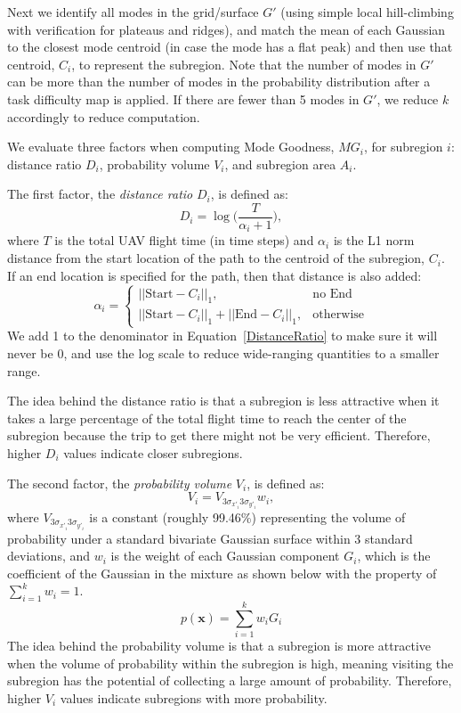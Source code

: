 \documentclass[journal]{IEEEtran}
\begin{document}
Next we identify all modes in the grid/surface $G'$ (using simple local hill-climbing with verification for plateaus and ridges), and match the mean of each Gaussian to the closest mode centroid (in case the mode has a flat peak) and then use that centroid, $C_i$, to represent the subregion. Note that the number of modes in $G'$ can be more than the number of modes in the probability distribution after a task difficulty map is applied. If there are fewer than 5 modes in $G'$, we reduce $k$ accordingly to reduce computation.

We evaluate three factors when computing Mode Goodness, $MG_i$, for subregion $i$: distance ratio $D_i$, probability volume $V_i$, and subregion area $A_i$. 

The first factor, the \textit{distance ratio} $D_i$, is defined as:
\begin{equation}
D_i = \log\Big(\frac{T}{\alpha_i+1}\Big),
\label{DistanceRatio}
\end{equation}
where $T$ is the total UAV flight time (in time steps) and $\alpha_i$ is the L1 norm distance from the start location of the path to the centroid of the subregion, $C_i$. If an end location is specified for the path, then that distance is also added:
\begin{equation}
\alpha_i = 
	\left\{
	\begin{array}{ll}
		||\mbox{Start}-C_i||_1, & \mbox{no End} \\
		||\mbox{Start}-C_i||_1 + ||\mbox{End}-C_i||_1, & \mbox{otherwise}
	\end{array}
	\right.
\label{Alpha}
\end{equation}
We add 1 to the denominator in Equation~\ref{DistanceRatio} to make sure it will never be 0, and use the log scale to reduce wide-ranging quantities to a smaller range. 

The idea behind the distance ratio is that a subregion is less attractive when it takes a large percentage of the total flight time to reach the center of the subregion because the trip to get there might not be very efficient. Therefore, higher $D_i$ values indicate closer subregions.

The second factor, the \textit{probability volume} $V_i$, is defined as:
\begin{equation}
V_i = V_{3\sigma_{x'_i}3\sigma_{y'_i}}w_i,
\label{Volume}
\end{equation}
where $V_{3\sigma_{x'_i}3\sigma_{y'_i}}$ is a constant (roughly 99.46\%) representing the volume of probability under a standard bivariate Gaussian surface within 3 standard deviations, and $w_i$ is the weight of each Gaussian component $G_i$, which is the coefficient of the Gaussian in the mixture as shown below with the property of $\sum_{i=1}^k w_i = 1$.
\begin{equation}
p(\mathbf{x}) = \sum_{i=1}^k w_i G_i
\label{Alphas}
\end{equation}
The idea behind the probability volume is that a subregion is more attractive when the volume of probability within the subregion is high, meaning visiting the subregion has the potential of collecting a large amount of probability. Therefore, higher $V_i$ values indicate subregions with more probability.
\end{document}
